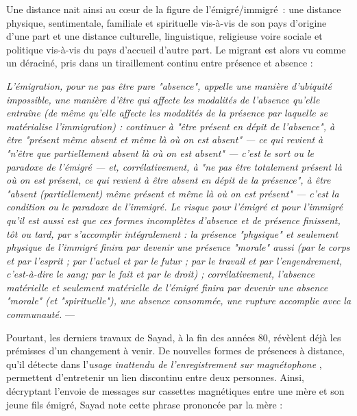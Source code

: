 \documentclass[symmetric,justified,marginals=raggedouter]{tufte-book}
\begin{document}
Une distance nait ainsi au cœur de la figure de l'émigré/immigré~: une distance physique, sentimentale, familiale et spirituelle vis-à-vis de son pays d'origine d'une part et une distance culturelle, linguistique, religieuse voire sociale et politique vis-à-vis du pays d'accueil d'autre part. Le migrant est alors vu comme un déraciné, pris dans un tiraillement continu entre présence et absence :\\

\newpage

\begin{fullwidth}
\og\textit{L'émigration, pour ne pas être pure "absence", appelle une manière d'ubiquité impossible, une manière d'être qui affecte les modalités de l'absence qu'elle entraîne (de même qu'elle affecte les modalités de la présence par laquelle se matérialise l'immigration) : continuer à "être présent en dépit de l'absence", à être "présent même absent et même là où on est absent" --- ce qui revient à "n'être que partiellement absent là où on est absent" --- c'est le sort ou le paradoxe de l'émigré --- et, corrélativement, à "ne pas être totalement présent là où on est présent, ce qui revient à être absent en dépit de la présence", à être "absent (partiellement) même présent et même là  où on est présent" --- c'est la condition ou le paradoxe de l'immigré. Le risque pour l'émigré et pour l'immigré qu'il est aussi est  que  ces  formes  incomplètes  d'absence  et  de  présence  finissent,  tôt  ou  tard,  par  s'accomplir intégralement : la présence "physique" et seulement physique de l'immigré finira par devenir une présence "morale" aussi (par le corps et par l'esprit ; par l'actuel et par le futur ; par le travail et par l'engendrement, c'est-à-dire le sang; par le fait et par le droit) ; corrélativement, l'absence matérielle et seulement matérielle de l'émigré finira par devenir une absence "morale" (et "spirituelle"), une absence consommée, une rupture accomplie avec la communauté.}\fg{} --- \citep[p.225-226]{sayad_double_1999}\\
\end{fullwidth}

\noindent Pourtant, les derniers travaux de Sayad, à la fin des années 80, révèlent déjà les prémisses d'un changement à venir. De nouvelles formes de présences à distance, qu'il détecte dans l'\textit{usage inattendu de l'enre\-gistrement sur magnétophone} \citep{sayad_du_1985}, permettent d'entretenir un lien discontinu entre deux personnes. Ainsi, décryptant l'envoie de messages sur cassettes magnétiques entre une mère et son jeune fils émigré, Sayad note cette phrase prononcée par la mère :\\
\end{document}
